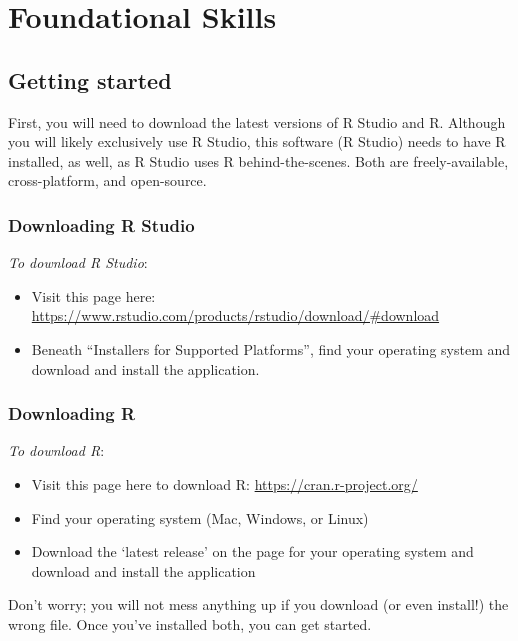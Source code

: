 \documentclass[]{article}
\title{}
\author{}
\date{}
\providecommand{\tightlist}{%
  \setlength{\itemsep}{0pt}\setlength{\parskip}{0pt}}
\begin{document}
\section{Foundational Skills}\label{foundational-skills}

\subsection{Getting started}\label{getting-started}

First, you will need to download the latest versions of R Studio and R.
Although you will likely exclusively use R Studio, this software (R
Studio) needs to have R installed, as well, as R Studio uses R
behind-the-scenes. Both are freely-available, cross-platform, and
open-source.

\subsubsection{Downloading R Studio}\label{downloading-r-studio}

\emph{To download R Studio}:

\begin{itemize}
\tightlist
\item
  Visit this page here:
  \url{https://www.rstudio.com/products/rstudio/download/\#download}
\item
  Beneath ``Installers for Supported Platforms'', find your operating
  system and download and install the application.
\end{itemize}

\subsubsection{Downloading R}\label{downloading-r}

\emph{To download R}:

\begin{itemize}
\tightlist
\item
  Visit this page here to download R: \url{https://cran.r-project.org/}
\item
  Find your operating system (Mac, Windows, or Linux)
\item
  Download the `latest release' on the page for your operating system
  and download and install the application
\end{itemize}

Don't worry; you will not mess anything up if you download (or even
install!) the wrong file. Once you've installed both, you can get
started.
\end{document}

